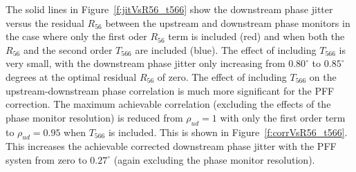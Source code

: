 The solid lines in Figure~\ref{f:jitVsR56_t566} show the downstream phase jitter versus the residual \(R_{56}\) between the upstream and downstream phase monitors in the case where only the first oder \(R_{56}\) term is included (red) and when both the \(R_{56}\) and the second order \(T_{566}\) are included (blue). The effect of including \(T_{566}\) is very small, with the downstream phase jitter only increasing from \(0.80^\circ\) to \(0.85^\circ\) degrees at the optimal residual \(R_{56}\) of zero. The effect of including \(T_{566}\) on the upstream-downstream phase correlation is much more significant for the PFF correction. The maximum achievable correlation (excluding the effects of the phase monitor resolution) is reduced from \(\rho_{ud} = 1\) with only the first order term to \(\rho_{ud} = 0.95\) when \(T_{566}\) is included. This is shown in Figure~\ref{f:corrVsR56_t566}.  This increases the achievable corrected downstream phase jitter with the PFF systen from zero to \(0.27^\circ\) (again excluding the phase monitor resolution). 

